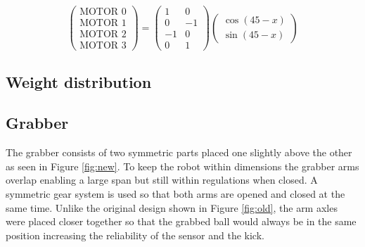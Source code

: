 \documentclass[a4paper,12pt]{article}
\begin{document}
$$\begin{pmatrix}
\text{MOTOR 0}\\ 
\text{MOTOR 1}\\ 
\text{MOTOR 2}\\ 
\text{MOTOR 3}
\end{pmatrix}=
\begin{pmatrix}
1 & 0\\ 
0 & -1\\ 
-1 & 0\\ 
0 & 1 
\end{pmatrix}
\begin{pmatrix}
\cos(45-x)\\ 
\sin(45-x)
\end{pmatrix}$$

\subsection{Weight distribution}

\subsection{Grabber}

The grabber consists of two symmetric parts placed one slightly above the other as seen in Figure \ref{fig:new}. To keep the robot within dimensions the grabber arms overlap enabling a large span but still within regulations when closed. A symmetric gear system is used so that both arms are opened and closed at the same time. Unlike the original design shown in Figure \ref{fig:old}, the arm axles were placed closer together so that the grabbed ball would always be in the same position increasing the reliability of the sensor and the kick.
\end{document}
